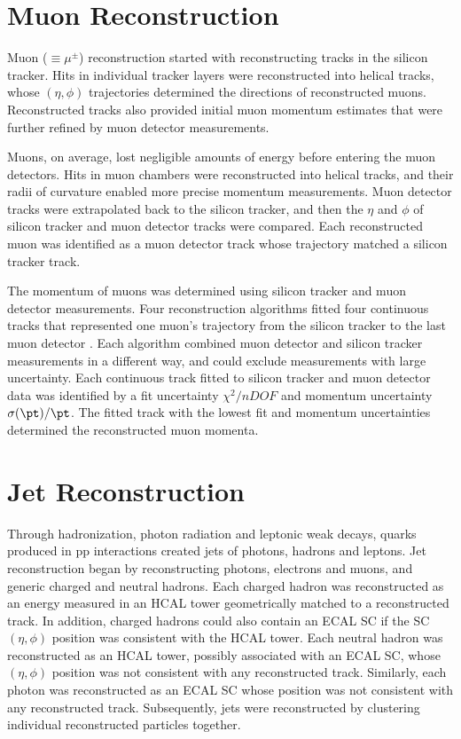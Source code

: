 \section{Muon Reconstruction}
\label{sec:muReco}
Muon ($\equiv \mu^{\pm}$) reconstruction started with reconstructing tracks in the silicon tracker.  
Hits in individual tracker layers were reconstructed into helical tracks, whose $(\eta, \phi)$ 
trajectories determined the directions of reconstructed muons.  Reconstructed tracks also provided 
initial muon momentum estimates that were further refined by muon detector measurements.

Muons, on average, lost negligible amounts of energy before entering the muon detectors.  Hits in 
muon chambers were reconstructed into helical tracks, and their radii of curvature enabled more precise 
momentum measurements.  Muon detector tracks were extrapolated back to the silicon tracker, and 
then the $\eta$ and $\phi$ of silicon tracker and muon detector tracks were compared.  Each 
reconstructed muon was identified as a muon detector track whose trajectory matched a silicon 
tracker track. 

The momentum of muons was determined using silicon tracker and muon detector measurements.  Four 
reconstruction algorithms fitted four continuous tracks that represented one muon's trajectory from 
the silicon tracker to the last muon detector \cite{cmsMuonRecoRunOne}.  Each algorithm combined 
muon detector and silicon tracker measurements in a different way, and could exclude measurements 
with large uncertainty.  Each continuous track fitted to silicon tracker and muon detector data was 
identified by a fit uncertainty $\chi^{2}/nDOF$ and momentum uncertainty $\sigma(\pt)/\pt$.  The 
fitted track with the lowest fit and momentum uncertainties determined the reconstructed muon momenta.


\section{Jet Reconstruction}
\label{sec:jetReco}
Through hadronization, photon radiation and leptonic weak decays, quarks produced in pp interactions 
created jets of photons, hadrons and leptons.  Jet reconstruction began by reconstructing photons, 
electrons and muons, and generic charged and neutral hadrons.  Each charged hadron was reconstructed as 
an energy measured in an HCAL tower geometrically matched to a reconstructed track.  In addition, 
charged hadrons could also contain an ECAL SC if the SC $(\eta, \phi)$ position was consistent with 
the HCAL tower.  Each neutral hadron was reconstructed as an HCAL tower, possibly associated with 
an ECAL SC, whose $(\eta, \phi)$ position was not consistent with any reconstructed track.  Similarly, 
each photon was reconstructed as an ECAL SC whose position was not consistent with any reconstructed 
track.  Subsequently, jets were reconstructed by clustering individual reconstructed particles together.

